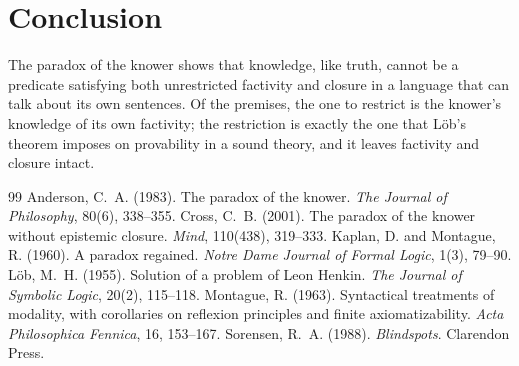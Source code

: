 \documentclass{situationist-preprint}
\begin{document}
\section{Conclusion}

The paradox of the knower shows that knowledge, like truth, cannot be a predicate satisfying both unrestricted factivity and closure in a language that can talk about its own sentences. Of the premises, the one to restrict is the knower's knowledge of its own factivity; the restriction is exactly the one that Löb's theorem imposes on provability in a sound theory, and it leaves factivity and closure intact.

\begin{thebibliography}{99}\small
{} Anderson, C.~A. (1983). The paradox of the knower. \emph{The Journal of Philosophy}, 80(6), 338--355.
 Cross, C.~B. (2001). The paradox of the knower without epistemic closure. \emph{Mind}, 110(438), 319--333.
 Kaplan, D. and Montague, R. (1960). A paradox regained. \emph{Notre Dame Journal of Formal Logic}, 1(3), 79--90.
 Löb, M.~H. (1955). Solution of a problem of Leon Henkin. \emph{The Journal of Symbolic Logic}, 20(2), 115--118.
 Montague, R. (1963). Syntactical treatments of modality, with corollaries on reflexion principles and finite axiomatizability. \emph{Acta Philosophica Fennica}, 16, 153--167.
 Sorensen, R.~A. (1988). \emph{Blindspots}. Clarendon Press.
\end{thebibliography}
\end{document}
